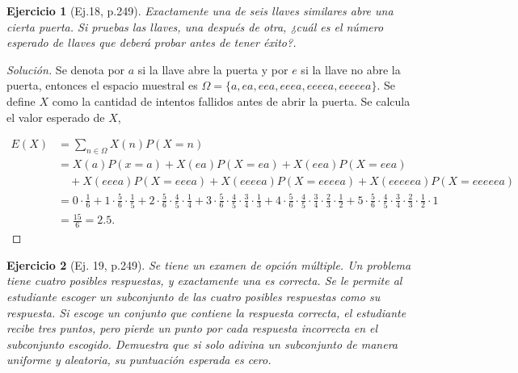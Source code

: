 \documentclass[12pt,letterpaper]{article}
\newtheorem{ej}{Ejercicio}
\begin{document}
\begin{ej}[Ej.18, p.249]
Exactamente una de seis llaves similares abre una cierta puerta. Si pruebas las llaves, una después de otra, ¿cuál es el número esperado de llaves que deberá probar antes de tener éxito?.
\end{ej}
\begin{proof}[Solución] Se denota por $a$ si la llave abre la puerta y por $e$ si la llave no abre la puerta, entonces el espacio muestral es $\Omega=\{a, ea, eea, eeea, eeeea, eeeeea\}$. Se define $X$ como la cantidad de intentos fallidos antes de abrir la puerta. Se calcula el valor esperado de $X$,

\begin{align*}
E(X) &= \sum_{n \in \Omega} X(n)P(X=n) \\ &= X(a)P(x=a) + X(ea)P(X=ea) + X(eea)P(X=eea) \\& \quad+ X(eeea)P(X=eeea) + X(eeeea)P(X=eeeea) + X(eeeeea)P(X=eeeeea) \\ &= 0 \cdot \frac{1}{6} + 1\cdot \frac{5}{6}\cdot\frac{1}{5} + 2\cdot\frac{5}{6}\cdot\frac{4}{5}\cdot\frac{1}{4} + 3\cdot \frac{5}{6}\cdot\frac{4}{5}\cdot\frac{3}{4}\cdot\frac{1}{3} + 4\cdot\frac{5}{6}\cdot\frac{4}{5}\cdot\frac{3}{4}\cdot\frac{2}{3}\cdot\frac{1}{2} +5\cdot\frac{5}{6}\cdot\frac{4}{5}\cdot\frac{3}{4}\cdot\frac{2}{3}\cdot\frac{1}{2}\cdot 1 \\ &= \frac{15}{6} = 2.5.
\end{align*}
\end{proof}

\begin{ej}[Ej. 19, p.249]
Se tiene un examen de opción múltiple. Un problema tiene cuatro posibles respuestas, y exactamente una es correcta. Se le permite al estudiante escoger un subconjunto de las cuatro posibles respuestas como su respuesta. Si escoge un conjunto que contiene la respuesta correcta, el estudiante recibe tres puntos, pero pierde un punto por cada respuesta incorrecta en el subconjunto escogido. Demuestra que si solo adivina un subconjunto de manera uniforme y aleatoria, su puntuación esperada es cero.
\end{ej}
\end{document}
